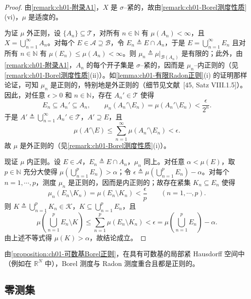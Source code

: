 \documentclass[../../main.tex]{subfiles}%
\begin{document}
\begin{proof}
由\cref{remark:ch01-附录A1}，$X$ 是 $\sigma$--紧的，故由\cref{remark:ch01-Borel测度性质}(vi)，$\mu$ 是适度的。

为证 $\mu$ 外正则，设 $\{A_n\}\subseteq\mathcal{T}$，对所有 $n\in\mathbb{N}$ 有 $\mu(A_n)<\infty$，且 $X=\bigcup_{n=1}^\infty A_n$。对每个 $E\in\mathcal{A}\supseteq\mathcal{B}$，令 $E_n\triangleq E\cap A_n$，于是 $E=\bigcup_{n=1}^\infty E_n$ 且对所有 $n\in\mathbb{N}$ 有 $\mu(E_n)\leqslant\mu(A_n)<\infty$。则 $\mu_n\triangleq \mu|_{\mathcal{B}(A_n)}$ 是有限的；此外，由\cref{remark:ch01-附录A1}，$A_n$ 的每个开子集是 $\sigma$--紧的，因而是 $\mu_n$--内正则的（见\cref{remark:ch01-Borel测度性质}(ii)）。如\cref{lemma:ch01-有限Radon正则}(i) 的证明那样论证，可知 $\mu_n$ 是正则的，特别地是外正则的（细节见文献~[45, Satz VIII.1.5]）。因此，对任意 $\epsilon>0$ 和 $n\in\mathbb{N}$，存在 $A_n'\in\mathcal{T}$ 使得
\[
E_n\subseteq A_n'\subseteq A_n,\qquad\mu_n(A_n'\setminus E_n)=\mu(A_n'\setminus E_n)<\frac{\epsilon}{2^n}.
\]
于是 $A'\triangleq \bigcup_{n=1}^\infty A_n'\in\mathcal{T}$，$A'\supseteq E$，且
\[
\mu(A'\setminus E)\leqslant\sum_{n=1}^\infty\mu(A_n'\setminus E_n)<\epsilon.
\]
故 $\mu$ 是外正则的（见\cref{remark:ch01-Borel测度性质}(i)）。

现证 $\mu$ 内正则。设 $E\in\mathcal{A}$，$E_n\triangleq E\cap A_n$，$\mu_n$ 同上。对任意 $\alpha<\mu(E)$，取 $p\in\mathbb{N}$ 充分大使得 $\mu(\bigcup_{n=1}^p E_n)>\alpha$；令 $\epsilon\triangleq \mu(\bigcup_{n=1}^p E_n)-\alpha$。对每个 $n=1,\cdots ,p$，测度 $\mu_n$ 是正则的，因而是内正则的；故存在紧集 $K_n\subseteq E_n$ 使得
\[
\mu_n(E_n\setminus K_n)=\mu(E_n\setminus K_n)<\frac{\epsilon}{p}\qquad(n=1,\cdots ,p).
\]
则 $K\triangleq \bigcup_{n=1}^p K_n\in\mathcal{K}$，$K\subseteq\bigcup_{n=1}^p E_n$，且
\[
\mu\left(\bigcup_{n=1}^p E_n\setminus K\right)\leqslant\sum_{n=1}^p\mu(E_n\setminus K_n)<\epsilon=\mu\left(\bigcup_{n=1}^p E_n\right)-\alpha.
\]
由上述不等式得 $\mu(K)>\alpha$，故结论成立。
\end{proof}

\begin{remark}\label{remark:ch01-BorelRadon一致}
由\cref{proposition:ch01-可数基Borel正则}，在具有可数基的局部紧 Hausdorff 空间中（例如在 $\mathbb{R}^N$ 中），Borel 测度与 Radon 测度重合且都是正则的。
\end{remark}

\subsection{零测集}\label{subsection:ch01-零测集}
\end{document}
